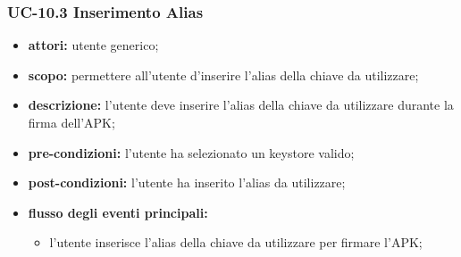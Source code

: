 \subsubsection{UC-10.3 Inserimento Alias}
\begin{itemize}
    \item \textbf{attori:} utente generico;
    \item \textbf{scopo:} permettere all'utente d'inserire l'alias della chiave da utilizzare;
    \item \textbf{descrizione:} l'utente deve inserire l'alias della chiave da utilizzare durante la firma dell'APK;
    \item \textbf{pre-condizioni:} l'utente ha selezionato un keystore valido;
    \item \textbf{post-condizioni:} l'utente ha inserito l'alias da utilizzare;
    \item \textbf{flusso degli eventi principali:}
    \begin{itemize}
        \item l'utente inserisce l'alias della chiave da utilizzare per firmare l'APK;
    \end{itemize}
\end{itemize}
